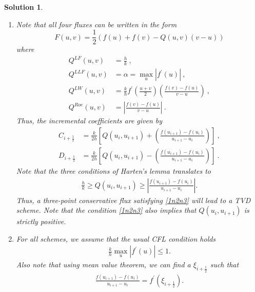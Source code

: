 \documentclass[10pt,letterpaper]{article}
\newcommand{\iph}{{i + \frac{1}{2}}}
\theoremstyle{break}
\newtheorem{mysolution}{Solution}
\newenvironment{solution}{\begin{mysolution}}{\end{mysolution}}
\begin{document}
\begin{solution}
        \begin{enumerate}
                \item
                Note that all four fluxes can be written in the form
                \[
                F(u,v) = \frac{1}{2} \left( f(u) + f(v) - Q(u,v) (v-u)\right)
                \]
                where
                \begin{align*}
                Q^{LF}(u,v) &= \frac{h}{k}\ ,\\
                Q^{LLF}(u,v) &= \alpha = \max_u |f^\prime(u)|\ ,\\
                Q^{LW}(u,v) &= \frac{k}{h} f^\prime\left( \frac{u+v}{2}\right)\left(\frac{f(v) - f(u)}{v-u}\right)\ ,\\
                Q^{Roe}(u,v) &= \left|\frac{f(v) - f(u)}{v-u}\right|\ .
                \end{align*}
                Thus, the incremental coefficients are given by
                \begin{align*}
                C_\iph &= \frac{k}{2h} \left [Q(u_i,u_{i+1})+\left(\frac{f(u_{i+1}) - f(u_i)}{u_{i+1} - u_i}\right) \right]\ ,\\
                D_\iph &= \frac{k}{2h} \left [Q(u_i,u_{i+1})-\left(\frac{f(u_{i+1}) - f(u_i)}{u_{i+1} - u_i}\right) \right] \ .
                \end{align*}
                Note that the three conditions of Harten's lemma translates to 
                \begin{align}
                \label{1n2n3}
                \frac{h}{k} \geq Q(u_i,u_{i+1}) \geq \left|\frac{f(u_{i+1}) - f(u_i)}{u_{i+1} - u_i}\right| .
                \end{align}
                Thus, a three-point conservative flux satisfying \eqref{1n2n3} will lead to a TVD scheme.
                Note that the condition \eqref{1n2n3} also implies that $Q(u_i,u_{i+1})$ is strictly positive.
                
                \item
                For all schemes, we assume that the usual CFL condition holds
                \begin{gather} \label{cfl}
                \frac{k}{h} \max_u |f^\prime(u)| \leq 1.
                \end{gather}
                Also note that using mean value theorem, we can find a $\xi_\iph$ such that
                \begin{gather} \label{mvt}
                \frac{f(u_{i+1}) - f(u_i)}{u_{i+1} - u_i} = f^\prime(\xi_\iph).
                \end{gather}
                \begin{itemize}
                

\end{itemize}
\end{enumerate}
\end{solution}
\end{document}
